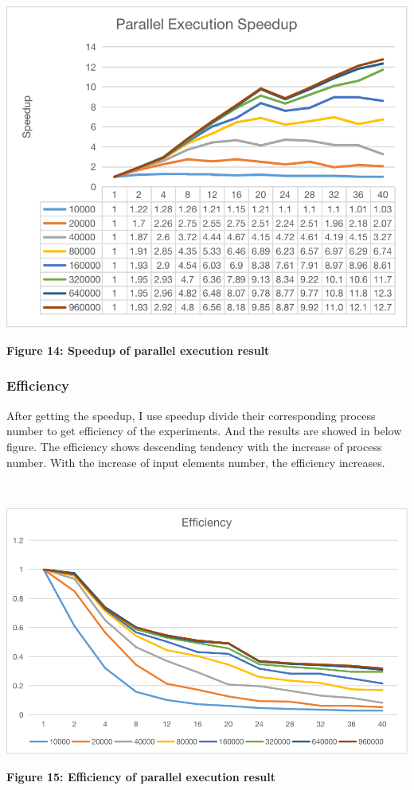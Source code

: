 ~\\
\centerline {\includegraphics[scale = 1, width=14cm]{speedup}}
\centerline{\textbf {Figure 14: Speedup of parallel execution result}}

\subsubsection{Efficiency}

After getting the speedup, I use speedup divide their corresponding process number to get efficiency of the experiments. And the results are showed in below figure. The efficiency shows descending tendency with the increase of process number. With the increase of input elements number, the efficiency increases.

~\\
\centerline {\includegraphics[scale = 1, width=14cm]{eff}}
\centerline{\textbf {Figure 15: Efficiency of parallel execution result}}

